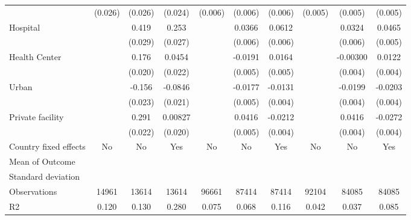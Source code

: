 {\begin{tabular}{l*{9}{c}}
                &  (0.026)         &  (0.026)         &  (0.024)         &  (0.006)         &  (0.006)         &  (0.006)         &  (0.005)         &  (0.005)         &  (0.005)         \\
Hospital        &                  &    0.419\sym{***}&    0.253\sym{***}&                  &   0.0366\sym{***}&   0.0612\sym{***}&                  &   0.0324\sym{***}&   0.0465\sym{***}\\
                &                  &  (0.029)         &  (0.027)         &                  &  (0.006)         &  (0.006)         &                  &  (0.006)         &  (0.005)         \\
Health Center   &                  &    0.176\sym{***}&   0.0454\sym{**} &                  &  -0.0191\sym{***}&   0.0164\sym{***}&                  & -0.00300         &   0.0122\sym{***}\\
                &                  &  (0.020)         &  (0.022)         &                  &  (0.005)         &  (0.005)         &                  &  (0.004)         &  (0.004)         \\
Urban           &                  &   -0.156\sym{***}&  -0.0846\sym{***}&                  &  -0.0177\sym{***}&  -0.0131\sym{***}&                  &  -0.0199\sym{***}&  -0.0203\sym{***}\\
                &                  &  (0.023)         &  (0.021)         &                  &  (0.005)         &  (0.004)         &                  &  (0.004)         &  (0.004)         \\
Private facility&                  &    0.291\sym{***}&  0.00827         &                  &   0.0416\sym{***}&  -0.0212\sym{***}&                  &   0.0416\sym{***}&  -0.0272\sym{***}\\
                &                  &  (0.022)         &  (0.020)         &                  &  (0.005)         &  (0.004)         &                  &  (0.004)         &  (0.004)         \\
\hline
Country fixed effects&       No         &       No         &      Yes         &       No         &       No         &      Yes         &       No         &       No         &      Yes         \\
Mean of Outcome &                  &                  &                  &                  &                  &                  &                  &                  &                  \\
Standard deviation&                  &                  &                  &                  &                  &                  &                  &                  &                  \\
Observations    &    14961         &    13614         &    13614         &    96661         &    87414         &    87414         &    92104         &    84085         &    84085         \\
R2              &    0.120         &    0.130         &    0.280         &    0.075         &    0.068         &    0.116         &    0.042         &    0.037         &    0.085         \\
\hline\hline
\end{tabular}
}
